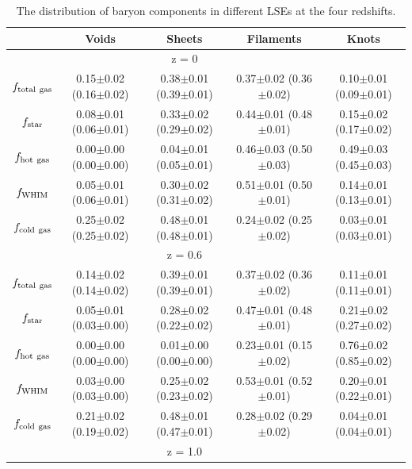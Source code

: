 \documentclass[aspectratio=169]{beamer}
\begin{document}
\begin{frame}[plain,t]
\begin{table}
\fontsize{8}{8}\selectfont
\caption{The distribution of baryon components in different LSEs at the four redshifts.}
  \begin{tabular}{c|c|c|c|c}
       & Voids & Sheets & Filaments & Knots \\
       \hline
       & & z = 0 & & \\
       \hline
    $f_{\rm total\ gas}$ & 0.15$\pm$0.02 (0.16$\pm$0.02) & 0.38$\pm$0.01 (0.39$\pm$0.01) & 0.37$\pm$0.02 (0.36$\pm$0.02) & 0.10$\pm$0.01 (0.09$\pm$0.01) \\
    $f_{\rm star}$       & 0.08$\pm$0.01 (0.06$\pm$0.01) & 0.33$\pm$0.02 (0.29$\pm$0.02) & 0.44$\pm$0.01 (0.48$\pm$0.01) & 0.15$\pm$0.02 (0.17$\pm$0.02) \\
    $f_{\rm hot\ gas}$   & 0.00$\pm$0.00 (0.00$\pm$0.00) & 0.04$\pm$0.01 (0.05$\pm$0.01) & 0.46$\pm$0.03 (0.50$\pm$0.03) & 0.49$\pm$0.03 (0.45$\pm$0.03) \\
    \alert{$f_{\rm WHIM}$}      & 0.05$\pm$0.01 (0.06$\pm$0.01) & 0.30$\pm$0.02 (0.31$\pm$0.02) & \alert{0.51}$\pm$0.01 (0.50$\pm$0.01) & 0.14$\pm$0.01 (0.13$\pm$0.01) \\
    $f_{\rm cold\ gas}$  & 0.25$\pm$0.02 (0.25$\pm$0.02) & 0.48$\pm$0.01 (0.48$\pm$0.01) & 0.24$\pm$0.02 (0.25$\pm$0.02) & 0.03$\pm$0.01 (0.03$\pm$0.01) \\
    \hline
       & & z = 0.6 & & \\
       \hline
    $f_{\rm total\ gas}$ & 0.14$\pm$0.02 (0.14$\pm$0.02) & 0.39$\pm$0.01 (0.39$\pm$0.01) & 0.37$\pm$0.02 (0.36$\pm$0.02) & 0.11$\pm$0.01 (0.11$\pm$0.01) \\
    $f_{\rm star}$       & 0.05$\pm$0.01 (0.03$\pm$0.00) & 0.28$\pm$0.02 (0.22$\pm$0.02) & 0.47$\pm$0.01 (0.48$\pm$0.01) & 0.21$\pm$0.02 (0.27$\pm$0.02) \\
    $f_{\rm hot\ gas}$   & 0.00$\pm$0.00 (0.00$\pm$0.00) & 0.01$\pm$0.00 (0.00$\pm$0.00) & 0.23$\pm$0.01 (0.15$\pm$0.02) & 0.76$\pm$0.02 (0.85$\pm$0.02) \\
    \alert{$f_{\rm WHIM}$}       & 0.03$\pm$0.00 (0.03$\pm$0.00) & 0.25$\pm$0.02 (0.23$\pm$0.02) & \alert{0.53}$\pm$0.01 (0.52$\pm$0.01) & 0.20$\pm$0.01 (0.22$\pm$0.01) \\ 
    $f_{\rm cold\ gas}$  & 0.21$\pm$0.02 (0.19$\pm$0.02) & 0.48$\pm$0.01 (0.47$\pm$0.01) & 0.28$\pm$0.02 (0.29$\pm$0.02) & 0.04$\pm$0.01 (0.04$\pm$0.01) \\
    \hline
      & & z = 1.0 & & \\

\end{tabular}
\end{table}
\end{frame}
\end{document}
